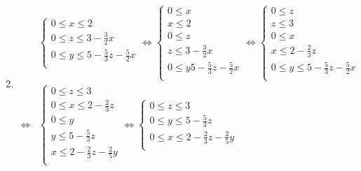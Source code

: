\documentclass[a4paper, 11pt]{article}
\begin{document}
\begin{enumerate}[label=(\alph*)]
\[	      \]
	\item
	      \begin{align*}
		       & \begin{cases}
			         0 \leq x\leq 2                      \\
			         0 \leq z\leq 3-\frac 32 x           \\
			         0 \leq y\leq 5-\frac 53z -\frac 52x \\
		         \end{cases}
		      \iff
		      \begin{cases}
			      0 \leq x                        \\
			      x\leq 2                         \\
			      0 \leq z                        \\
			      z\leq 3-\frac 32 x              \\
			      0 \leq y 5-\frac 53z -\frac 52x \\
		      \end{cases}
		      \iff
		      \begin{cases}
			      0 \leq z                             \\
			      z\leq 3                              \\
			      0 \leq x                             \\
			      x \leq 2 -\frac 23 z                 \\
			      0 \leq y \leq 5-\frac 53z -\frac 52x \\
		      \end{cases}   \\
		      \iff
		       & \begin{cases}
			         0 \leq z\leq 3                 \\
			         0 \leq x \leq 2 -\frac 23 z    \\
			         0 \leq y                       \\
			         y\leq 5-\frac 53z              \\
			         x\leq 2-\frac 23z  - \frac 25y \\
		         \end{cases}
		      \iff
		      \begin{cases}
			      0 \leq z \leq 3                       \\
			      0 \leq y \leq 5-\frac 53z             \\
			      0 \leq x \leq 2-\frac 23z  -\frac 25y \\

\end{cases}
\end{align*}
\end{enumerate}
\end{document}
